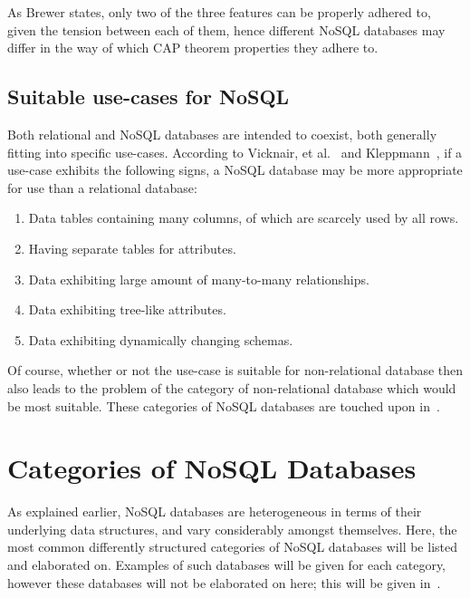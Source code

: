 \documentclass{article}
\begin{document}
As Brewer states, only two of the three features can be properly adhered to, given the tension between each of them, hence
different NoSQL databases may differ in the way of which CAP theorem properties they adhere to.

\subsection{Suitable use-cases for NoSQL}
\label{ssub:suitable_usecase}

Both relational and NoSQL databases are intended to coexist, both generally fitting into specific use-cases. According to
Vicknair, et al.~\cite{vicknair2010comparison} and Kleppmann~\cite{1_kleppmann_2009}, if a use-case exhibits the following
signs, a NoSQL database may be more appropriate for use than a relational database:

\begin{enumerate}
    \item Data tables containing many columns, of which are scarcely used by all rows.
    \item Having separate tables for attributes.
    \item Data exhibiting large amount of many-to-many relationships.
    \item Data exhibiting tree-like attributes.
    \item Data exhibiting dynamically changing schemas.
\end{enumerate}

Of course, whether or not the use-case is suitable for non-relational database then also leads to the problem of the
category of non-relational database which would be most suitable. These categories of NoSQL databases are touched upon
in~.





\section{Categories of NoSQL Databases} %
\label{sec:categories_of_nosql_databases}

As explained earlier, NoSQL databases are heterogeneous in terms of their underlying data structures, and vary
considerably amongst themselves. Here, the most common differently structured categories of NoSQL databases will be
listed and elaborated on. Examples of such databases will be given for each category, however these databases will
not be elaborated on here; this will be given in~.
\end{document}

